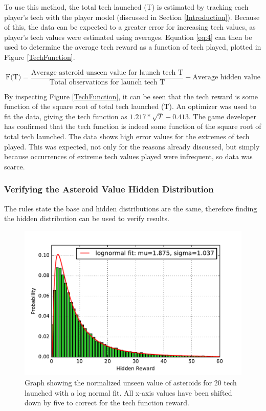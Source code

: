 \documentclass[11pt, twoside]{article}
\begin{document}
To use this method, the total tech launched (T) is estimated by tracking each player's tech with the player model (discussed in Section \ref{Introduction}). Because of this, the data can be expected to a greater error for increasing tech values, as player's tech values were estimated using averages. Equation \ref{eq:4} can then be used to determine the average tech reward as a function of tech played, plotted in Figure \ref{TechFunction}.

\begin{equation}
\text{F(T)}=\dfrac{\text{Average asteroid unseen value for launch tech T}}{\text{Total observations for launch tech T}} - \text{Average hidden value}
\label{eq:4}
\end{equation}

 By inspecting Figure \ref{TechFunction}, it can be seen that the tech reward is some function of the square root of total tech launched (T). An optimizer was used to fit the data, giving the tech function as $1.217 * \sqrt{T} - 0.413$. The game developer has confirmed that the tech function is indeed some function of the square root of total tech launched. The data shows high error values for the extremes of tech played. This was expected, not only for the reasons already discussed, but simply because occurrences of extreme tech values played were infrequent, so data was scarce.

\subsubsection*{Verifying the Asteroid Value Hidden Distribution}
The rules state the base and hidden distributions are the same, therefore finding the hidden distribution can be used to verify results.

\begin{figure}[b!]
	\centering
	\includegraphics{hidden_distribution.pdf}
	\caption{Graph showing the normalized unseen value of asteroids for 20 tech launched with a log normal fit. All x-axis values have been shifted down by five to correct for the tech function reward.}
	\label{HiddenDist}
\end{figure}
\end{document}

